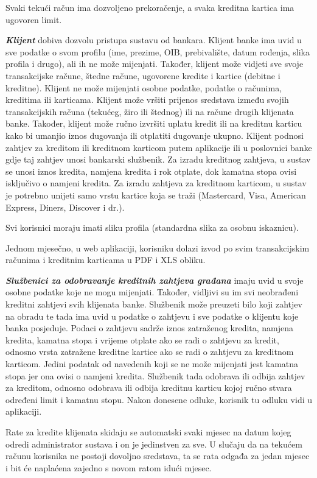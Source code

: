 		Svaki tekući račun ima dozvoljeno prekoračenje, a svaka kreditna kartica ima ugovoren limit.
		
		\textit{\textbf{Klijent}} dobiva dozvolu pristupa sustavu od bankara. Klijent banke ima uvid u sve podatke o svom profilu (ime, prezime, OIB, prebivalište, datum rođenja, slika profila i drugo), ali ih ne može mijenjati. Također, klijent može vidjeti sve svoje transakcijske račune, štedne račune, ugovorene kredite i kartice (debitne i kreditne). Klijent ne može mijenjati osobne podatke, podatke o računima, kreditima ili karticama. Klijent može vršiti prijenos sredstava između svojih transakcijskih računa (tekućeg, žiro ili štednog) ili na račune drugih klijenata banke. Također, klijent može ručno izvršiti uplatu kredit ili na kreditnu karticu kako bi umanjio iznos dugovanja ili otplatiti dugovanje ukupno.
		Klijent podnosi zahtjev za kreditom ili kreditnom karticom putem aplikacije ili u poslovnici banke gdje taj zahtjev unosi bankarski službenik. Za izradu kreditnog zahtjeva, u sustav se unosi iznos kredita, namjena kredita i rok otplate, dok kamatna stopa ovisi isključivo o namjeni kredita. Za izradu zahtjeva za kreditnom karticom, u sustav je potrebno unijeti samo vrstu kartice koja se traži (Mastercard, Visa, American Express, Diners, Discover i dr.).
		
		Svi korisnici moraju imati sliku profila (standardna slika za osobnu iskaznicu).
		
		Jednom mjesečno, u web aplikaciji, korisniku dolazi izvod po svim transakcijskim računima i kreditnim karticama u PDF i XLS obliku.
		
		\textit{\textbf{Službenici za odobravanje kreditnih zahtjeva građana}} imaju uvid u svoje osobne podatke koje ne mogu mijenjati. Također, vidljivi su im svi neobrađeni kreditni zahtjevi svih klijenata banke. Službenik može preuzeti bilo koji zahtjev na obradu te tada ima uvid u podatke o zahtjevu i sve podatke o klijentu koje banka posjeduje. Podaci o zahtjevu sadrže iznos zatraženog kredita, namjena kredita, kamatna stopa i vrijeme otplate ako se radi o zahtjevu za kredit, odnosno vrsta zatražene kreditne kartice ako se radi o zahtjevu za kreditnom karticom. Jedini podatak od navedenih koji se ne može mijenjati jest kamatna stopa jer ona ovisi o namjeni kredita. Službenik tada odobrava ili odbija zahtjev za kreditom, odnosno odobrava ili odbija kreditnu karticu kojoj ručno stvara određeni limit i kamatnu stopu.
		Nakon donesene odluke, korisnik tu odluku vidi u aplikaciji.
		
		Rate za kredite klijenata skidaju se automatski svaki mjesec na datum kojeg odredi administrator sustava i on je jedinstven za sve. U slučaju da na tekućem računu korisnika ne postoji dovoljno sredstava, ta se rata odgađa za jedan mjesec i bit će naplaćena zajedno s novom ratom idući mjesec.
		
